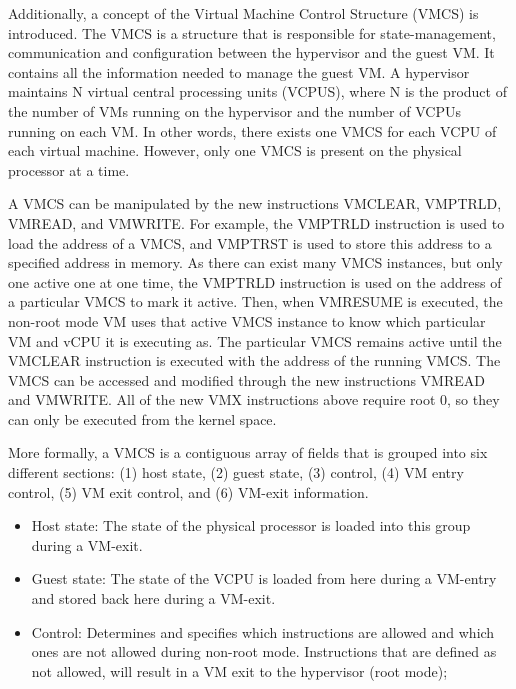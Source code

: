 \documentclass{report}
\begin{document}
\begin{spacing}{1.5}
{\large
Additionally, a concept of the Virtual Machine Control Structure (VMCS) is introduced. The VMCS is a structure that is responsible for state-management, communication and configuration between the hypervisor and the guest VM. It contains all the information needed to manage the guest VM. A hypervisor maintains N virtual central processing units (VCPUS), where N is the product of the number of VMs running on the hypervisor and the number of VCPUs running on each VM. In other words, there exists one VMCS for each VCPU of each virtual machine. However, only one VMCS is present on the physical processor at a time. 
\newline
}

{\large
A VMCS can be manipulated by the new instructions VMCLEAR, VMPTRLD, VMREAD, and VMWRITE. For example, the VMPTRLD instruction is used to load the address of a VMCS, and VMPTRST is used to store this address to a specified address in memory. As there can exist many VMCS instances, but only one active one at one time, the VMPTRLD instruction is used on the address of a particular VMCS to mark it active. Then, when VMRESUME is executed, the non-root mode VM uses that active VMCS instance to know which particular VM and vCPU it is executing as. The particular VMCS remains active until the VMCLEAR instruction is executed with the address of the running VMCS. The VMCS can be accessed and modified through the new instructions VMREAD and VMWRITE. All of the new VMX instructions above require root 0, so they can only be executed from the kernel space.

More formally, a VMCS is a contiguous array of fields that is grouped into six different sections: (1) host state, (2) guest state, (3) control, (4) VM entry control, (5) VM exit control, and (6) VM-exit information.
\newline
}

{\large
\begin{itemize}
    \item Host state: The state of the physical processor is loaded into this group during a VM-exit.

    \item Guest state: The state of the VCPU is loaded from here during a VM-entry and stored back here during a VM-exit.

    \item Control: Determines and specifies which instructions are allowed and which ones are not allowed during non-root mode. Instructions that are defined as not allowed, will result in a VM exit to the hypervisor (root mode);


\end{itemize}}
\end{spacing}
\end{document}
